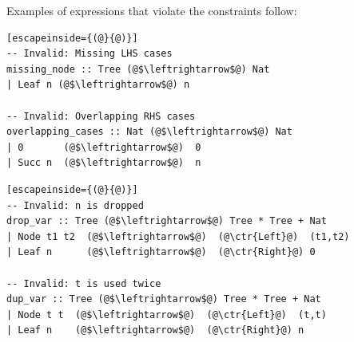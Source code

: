 \documentclass{article}
\newcommand{\ctr}[1]{{\scriptsize{\texttt{#1}}}}
\begin{document}
Examples of expressions that violate the constraints follow:

\begin{multicols}{2}
\begin{lstlisting}[escapeinside={(@}{@)}]
-- Invalid: Missing LHS cases
missing_node :: Tree (@$\leftrightarrow$@) Nat
| Leaf n (@$\leftrightarrow$@) n

-- Invalid: Overlapping RHS cases
overlapping_cases :: Nat (@$\leftrightarrow$@) Nat
| 0       (@$\leftrightarrow$@)  0
| Succ n  (@$\leftrightarrow$@)  n
 \end{lstlisting}

\begin{lstlisting}[escapeinside={(@}{@)}]
-- Invalid: n is dropped
drop_var :: Tree (@$\leftrightarrow$@) Tree * Tree + Nat
| Node t1 t2  (@$\leftrightarrow$@)  (@\ctr{Left}@)  (t1,t2)
| Leaf n      (@$\leftrightarrow$@)  (@\ctr{Right}@) 0

-- Invalid: t is used twice
dup_var :: Tree (@$\leftrightarrow$@) Tree * Tree + Nat
| Node t t  (@$\leftrightarrow$@)  (@\ctr{Left}@)  (t,t)
| Leaf n    (@$\leftrightarrow$@)  (@\ctr{Right}@) n
 \end{lstlisting}
\end{multicols}
\end{document}
